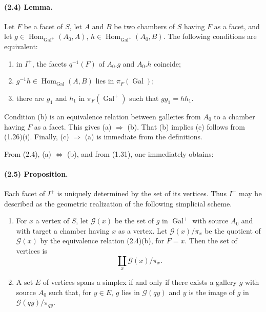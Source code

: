 \documentclass[10pt]{article}
\begin{document}
\paragraph{(2.4) Lemma.} Let \(F\) be a facet of \(S\), let \(A\) and \(B\) be two chambers of \(S\) having \(F\) as a facet, and let \(g\in\operatorname{Hom}_{\operatorname{Gal}^+}(A_0,A)\), \(h\in\operatorname{Hom}_{\operatorname{Gal}^+}(A_0,B)\). The following conditions are equivalent:
\begin{enumerate}[label=(\alph*)]
\item in \(I^+\), the facets \(q^{-1}(F)\) of \(A_0.g\) and \(A_0.h\) coincide;
\item \(g^{-1}h\in\operatorname{Hom}_{\operatorname{Gal}}(A,B)\) lies in \(\pi_F(\operatorname{Gal})\);
\item there are \(g_1\) and \(h_1\) in \(\pi_F(\operatorname{Gal}^+)\) such that \(gg_1=hh_1\).
\end{enumerate}
Condition (b) is an equivalence relation between galleries from \(A_0\) to a chamber having \(F\) as a facet. This gives (a) \(\Rightarrow\) (b). That (b) implies (c) follows from (1.26)(i). Finally, (c) \(\Rightarrow\) (a) is immediate from the definitions.

From (2.4), (a) \(\Leftrightarrow\) (b), and from (1.31), one immediately obtains:

\paragraph{(2.5) Proposition.} Each facet of \(I^+\) is uniquely determined by the set of its vertices. Thus \(I^+\) may be described as the geometric realization of the following simplicial scheme.
\begin{enumerate}[label=\alph*)]
\item For \(x\) a vertex of \(S\), let \(\mathcal G(x)\) be the set of \(g\) in \(\operatorname{Gal}^+\) with source \(A_0\) and with target a chamber having \(x\) as a vertex. Let \(\mathcal G(x)/\pi_x\) be the quotient of \(\mathcal G(x)\) by the equivalence relation (2.4)(b), for \(F=x\). Then the set of vertices is
\[
\coprod_x \mathcal G(x)/\pi_x.
\]
\item A set \(E\) of vertices spans a simplex if and only if there exists a gallery \(g\) with source \(A_0\) such that, for \(y\in E\), \(g\) lies in \(\mathcal G(qy)\) and \(y\) is the image of \(g\) in \(\mathcal G(qy)/\pi_{qy}\).
\end{enumerate}
\end{document}
